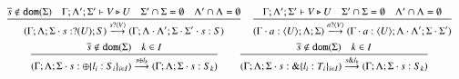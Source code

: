 \begin{figure}
\[\begin{array}{c}
%

		\tree{
			\dual{s} \notin \dom{\Sigma} \quad \Gamma; \Lambda'; \Sigma' \proves V \hastype U \quad \Sigma' \cap \Sigma = \es \quad \Lambda' \cap \Lambda = \es
		}{
			(\Gamma; \Lambda; \Sigma \cat s: \btinp{U} S) \by{\bactinp{s}{V}} (\Gamma; \Lambda\cat\Lambda'; \Sigma\cat\Sigma' \cat s: S)
		}
		\quad
		\tree{
			\Gamma; \Lambda'; \Sigma' \proves V \hastype U \quad \Sigma' \cap \Sigma = \es \quad \Lambda' \cap \Lambda = \es
		}{
			(\Gamma \cat a: \chtype{U}; \Lambda; \Sigma) \by{\bactinp{a}{V}} (\Gamma \cat a: \chtype{U}; \Lambda\cat\Lambda'; \Sigma\cat\Sigma')
		}
		\\[6mm]

		\tree{
			\dual{s} \notin \dom{\Sigma} \quad k \in I
		}{
			(\Gamma; \Lambda; \Sigma \cat s: \btsel{l_i: S_i}_{i \in I}) \by{\bactsel{s}{l_k}} (\Gamma; \Lambda; \Sigma \cat s:S_k)
		}
		\qquad
		\tree{
			\dual{s} \notin \dom{\Sigma} \quad k \in I
		}{
			(\Gamma; \Lambda; \Sigma \cat s: \btbra{l_i: T_i}_{i \in I}) \by{\bactbra{s}{l_k}} (\Gamma; \Lambda; \Sigma \cat s:S_k)
		}
		\\[6mm]


\end{array}\]
\end{figure}
